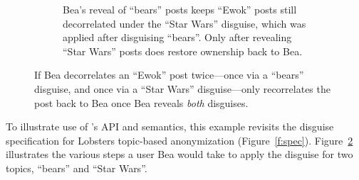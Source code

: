 \begin{figure}
\begin{subfigure}[t]{.47\columnwidth}
  \caption{Bea's reveal of ``bears'' posts keeps ``Ewok'' posts still
    decorrelated under the ``Star Wars'' disguise, which was applied after
    disguising ``bears''. Only after revealing ``Star Wars'' posts does \sys
    restore ownership back to Bea.}
\label{f:composition-hl-ooo}
\end{subfigure}
    \caption[\sys only reveals the original state of data disguised multiple times once
    all disguises appied to the data have been revealed.]{
        If Bea decorrelates an ``Ewok'' post twice---once via a ``bears''
        disguise, and once via a ``Star Wars'' disguise---\sys only recorrelates
        the post back to Bea once Bea reveals \emph{both} disguises.}
\label{f:composition-hl}
\end{figure}

%
To illustrate use of \sys's API and semantics, this example revisits the disguise 
specification for Lobsters topic-based anonymization (Figure~\ref{f:spec}). 
Figure~\ref{f:composition-hl} illustrates the various steps a user Bea would
take to apply the disguise for two topics, ``bears'' and ``Star Wars''.

